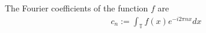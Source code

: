 \documentclass{article}
\begin{document}
\begin{CJK}{UTF8}{gbsn}

\title{}
\author{李岳恒}
\maketitle



The Fourier coefficients of the function $f$ are
\begin{align*}
c_n:=\int_{\mathbb{T}}f(x)e^{-i2\pi nx}dx	
\end{align*}





\end{CJK}
\end{document}
